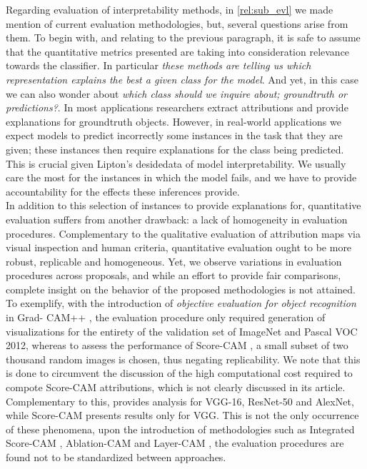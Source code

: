 \noindent Regarding evaluation of interpretability methods, in \autoref{rel:sub_evl} we made mention 
of current evaluation methodologies, but, several questions arise from them. To begin with, and                                                                                                          
relating to the previous paragraph, it is safe to assume that the quantitative metrics presented 
are taking into consideration relevance towards the classifier. In particular \emph{these 
methods are telling us which representation explains the best a given class for the model}. 
And yet, in this case we can also wonder about \emph{which class should we inquire about; 
groundtruth or predictions?}. In most applications researchers extract attributions and provide 
explanations for groundtruth objects. However, in real-world applications we expect models to 
predict incorrectly some instances in the task that they are given; these instances then require 
explanations for the class being predicted. This is crucial given Lipton's desidedata of model 
interpretability. We usually care the most for the instances in which the model fails, and we have 
to provide accountability for the effects these inferences provide.\\

\noindent In addition to this selection of instances to provide explanations for, quantitative 
evaluation suffers from another drawback: a lack of homogeneity in evaluation procedures. 
Complementary to the qualitative evaluation of attribution maps via visual inspection and human 
criteria, quantitative evaluation ought to be more robust, replicable and homogeneous. Yet, we 
observe variations in evaluation procedures across proposals, and while an effort to provide fair 
comparisons, complete insight on the behavior of the proposed methodologies is not attained. 
To exemplify, with the introduction of \emph{objective evaluation for object recognition} in Grad-
CAM++ \autocite{chattopadhay2018grad}, the evaluation procedure only required generation of 
visualizations for the entirety of the validation set of ImageNet and Pascal VOC 2012, whereas 
to assess the performance of Score-CAM \autocite{wang2020score}, a small subset of two thousand 
random images is chosen, thus negating replicability. We note that this is done to circumvent the 
discussion of the high computational cost required to compote Score-CAM attributions, which is  
not clearly discussed in its article. Complementary to this, 
\cite{chattopadhay2018grad} provides analysis for VGG-16, ResNet-50 and AlexNet, while Score-CAM 
presents results only for VGG.  This is not the only occurrence of these phenomena, upon the 
introduction of methodologies such as Integrated Score-CAM \autocite{naidu2020cam}, Ablation-CAM
\autocite{ablationcam} and Layer-CAM \autocite{jiang2021layercam}, the evaluation procedures are 
found not to be standardized between approaches.\\

